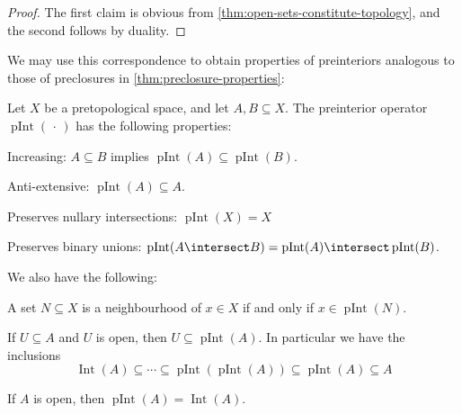 \documentclass[article, a4paper, 11pt, oneside]{memoir}
\numberwithin{equation}{chapter}
\newcommand{\pInt}[1]{\operatorname{pInt}(#1)}
\renewcommand{\interior}[1]{\operatorname{Int}(#1)}
\begin{document}
\begin{proof}
    The first claim is obvious from \cref{thm:open-sets-constitute-topology}, and the second follows by duality.
\end{proof}

We may use this correspondence to obtain properties of preinteriors analogous to those of preclosures in \cref{thm:preclosure-properties}:

\begin{proposition}
    \label{thm:preinterior-properties}
    Let $X$ be a pretopological space, and let $A,B \subseteq X$. The preinterior operator $\pInt{\,\cdot\,}$ has the following properties:
    \begin{enumprop}
        \item \label{enum:preinterior-increasing} Increasing: $A \subseteq B$ implies $\pInt{A} \subseteq \pInt{B}$.
        
        \item \label{enum:preinterior-antiextensive} Anti-extensive: $\pInt{A} \subseteq A$.
        
        \item \label{enum:preinterior-nullary-intersections} Preserves nullary intersections: $\pInt{X} = X$
        
        \item \label{enum:preinterior-binary-intersections} Preserves binary unions: $\pInt{A \intersect B} = \pInt{A} \intersect \pInt{B}$.
    \end{enumprop}
    We also have the following:
    \begin{enumprop}[resume]
        \item \label{enum:preinterior-characterisation-of-nhoods} A set $N \subseteq X$ is a neighbourhood of $x \in X$ if and only if $x \in \pInt{N}$.

        \item \label{enum:preinterior-inclusion-series} If $U \subseteq A$ and $U$ is open, then $U \subseteq \pInt{A}$. In particular we have the inclusions
        \begin{equation*}
            \interior{A}
                \subseteq \cdots
                \subseteq \pInt{\pInt{A}}
                \subseteq \pInt{A}
                \subseteq A
        \end{equation*}
        
        \item \label{enum:preinterior-equals-itnerior} If $A$ is open, then $\pInt{A} = \interior{A}$.
    \end{enumprop}
\end{proposition}
\end{document}
